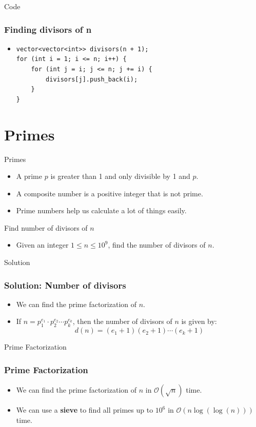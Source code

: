 \documentclass{beamer}
\begin{document}
\begin{frame}[fragile]{Code}
  \frametitle{Finding divisors of n}
  \begin{itemize}
    \item<1-> \begin{verbatim}
vector<vector<int>> divisors(n + 1);
for (int i = 1; i <= n; i++) {
    for (int j = i; j <= n; j += i) {
        divisors[j].push_back(i);
    }
}
\end{verbatim}

  \end{itemize}
\end{frame}

\section{Primes}
\begin{frame}[fragile]{Primes}
  \begin{itemize}
    \item<1-> A prime $p$ is greater than 1 and only divisible by 1 and $p$.
    \item<2-> A composite number is a positive integer that is not prime.
    \item<3-> Prime numbers help us calculate a lot of things easily.
  \end{itemize}
\end{frame}

\begin{frame}[fragile]{Find number of divisors of $n$}
  \begin{itemize}
    \item<1-> Given an integer $1 \leq n \leq 10^9$, find the number of divisors of $n$.
  \end{itemize}
\end{frame}
\begin{frame}[fragile]{Solution}
  \frametitle{Solution: Number of divisors}
  \begin{itemize}
    \item<1-> We can find the prime factorization of $n$.
    \item<2-> If $n = p_1^{e_1} \cdot p_2^{e_2} \cdots p_k^{e_k}$, then the number of divisors of $n$ is given by:
    \[
      d(n) = (e_1 + 1)(e_2 + 1) \cdots (e_k + 1)
    \]
  \end{itemize}
\end{frame}


\begin{frame}[fragile]{Prime Factorization}
  \frametitle{Prime Factorization}
  \begin{itemize}
    \item<1-> We can find the prime factorization of $n$ in $\mathcal{O}(\sqrt{n})$ time.
    \item<2-> We can use a \textbf{sieve} to find all primes up to $10^6$ in $\mathcal{O}(n \log(\log(n)))$ time.
  \end{itemize}
\end{frame}
\end{document}
